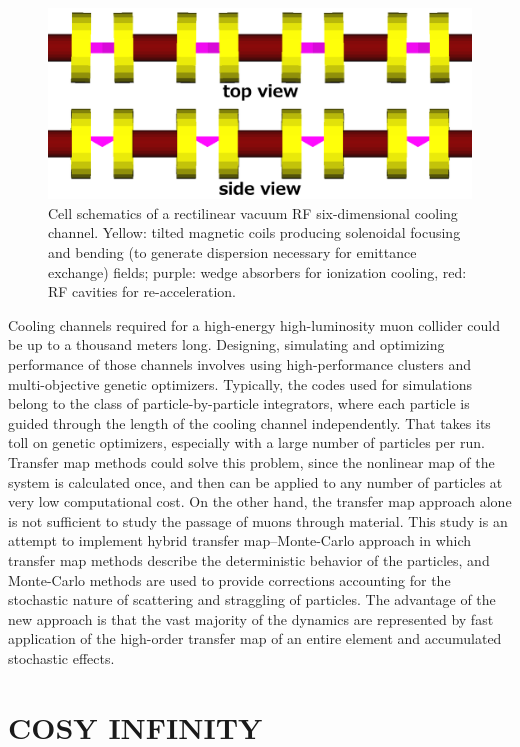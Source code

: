 \documentclass{jacow}
\begin{document}
\begin{figure}[htbf] 
\centering
\includegraphics[width=\columnwidth]{vcc}
\caption{Cell schematics of a rectilinear vacuum RF six-dimensional cooling channel. Yellow: tilted magnetic coils producing solenoidal focusing and bending (to generate dispersion necessary for emittance exchange) fields; purple: wedge absorbers for ionization cooling, red: RF cavities for re-acceleration.}
\label{fig:vcc}
\end{figure}

Cooling channels required for a high-energy high-luminosity muon collider could be up to a thousand meters long. Designing, simulating and optimizing performance of those channels involves using high-performance clusters and multi-objective genetic optimizers. Typically, the codes used for simulations belong to the class of particle-by-particle integrators, where each particle is guided through the length of the cooling channel independently. That takes its toll on genetic optimizers, especially with a large number of particles per run. Transfer map methods could solve this problem, since the nonlinear map of the system is calculated once, and then can be applied to any number of particles at very low computational cost. On the other hand, the transfer map approach alone is not sufficient to study the passage of muons through material. This study is an attempt to implement hybrid transfer map--Monte-Carlo approach in which transfer map methods describe the deterministic behavior of the particles, and Monte-Carlo methods are used to provide corrections accounting for the stochastic nature of scattering and straggling of particles. The advantage of the new approach is that the vast majority of the dynamics are represented by fast application of the high-order transfer map of an entire element and accumulated stochastic effects.

\section{COSY INFINITY}
\end{document}

